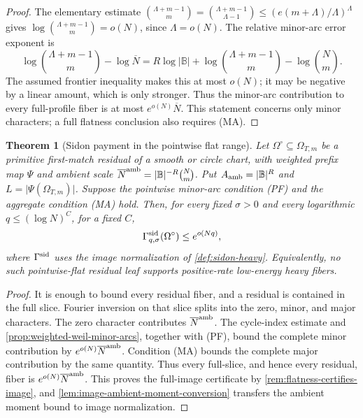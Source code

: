 \documentclass[12pt,a4paper]{amsart}
\numberwithin{equation}{section}
\newtheorem{theorem}{Theorem}[section]
\theoremstyle{remark}
\newcommand{\B}{\mathbb B}
\newcommand{\Omc}{\Omega^{\circ}}
\newcommand{\Gsid}{\Gamma^{\rm sid}}
\newcommand{\barN}{\overline N}
\newcommand{\abs}[1]{\lvert #1\rvert}
\begin{document}
\begin{proof}
The elementary estimate \(\binom{\Lambda+m-1}{m}=\binom{\Lambda+m-1}{\Lambda-1}\le (e(m+\Lambda)/\Lambda)^{\Lambda}\) gives \(\log\binom{\Lambda+m-1}{m}=o(N)\), since \(\Lambda=o(N)\).  The relative minor-arc error exponent is
\[
        \log\binom{\Lambda+m-1}{m}-\log\barN
        =R\log\abs\B+\log\binom{\Lambda+m-1}{m}-\log\binom Nm.
\]
The assumed frontier inequality makes this at most \(o(N)\); it may be
negative by a linear amount, which is only stronger.  Thus the minor-arc
contribution to every full-profile fiber is at most
\(e^{o(N)}\barN\).  This statement concerns only minor characters; a
full flatness conclusion also requires \textup{(MA)}.
\end{proof}

\begin{theorem}[Sidon payment in the pointwise flat range]\label{thm:sidon-resolved-payment}\label{thm:no-sidon-heavy-fourier}\label{thm:fourier-sidon-closure}
Let \(\Omc\subseteq\Omega_{T,m}\) be a primitive first-match residual of a
smooth or circle chart, with weighted prefix map \(\Psi\) and ambient
scale \(\barN^{\rm amb}=\abs\B^{-R}\binom Nm\).  Put
\(A_{\rm amb}=\abs\B^R\) and
\(L=\abs{\Psi(\Omega_{T,m})}\).  Suppose the pointwise minor-arc
condition \textup{(PF)} and the aggregate condition \textup{(MA)} hold.
Then, for every fixed \(\sigma>0\) and every
logarithmic \(q\le(\log N)^C\), for a fixed \(C\),
\[
        \Gsid_{q,\sigma}(\Omc)\le e^{o(Nq)},
\]
where \(\Gsid\) uses the image normalization of
\cref{def:sidon-heavy}.
Equivalently, no such pointwise-flat residual leaf supports positive-rate
low-energy heavy fibers.
\end{theorem}

\begin{proof}
It is enough to bound every residual fiber, and a residual is contained in
the full slice.  Fourier inversion on that slice splits into the zero,
minor, and major characters.  The zero character contributes
\(\barN^{\rm amb}\).
The cycle-index estimate and \cref{prop:weighted-weil-minor-arcs}, together
with \textup{(PF)}, bound the complete minor contribution by
\(e^{o(N)}\barN^{\rm amb}\).  Condition \textup{(MA)} bounds the complete major
contribution by the same quantity.  Thus every full-slice, and hence every
residual, fiber is \(e^{o(N)}\barN^{\rm amb}\).  This proves the
full-image certificate by \cref{rem:flatness-certifies-image}, and
\cref{lem:image-ambient-moment-conversion} transfers the ambient moment
bound to image normalization.
\end{proof}
\end{document}
